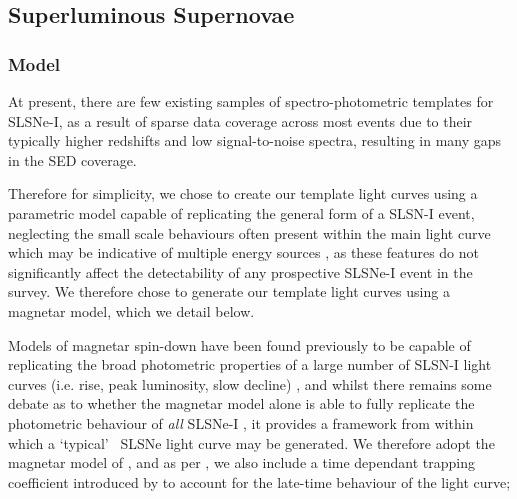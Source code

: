 \documentclass[a4paper,fleqn,usenatbib]{mnras}
\newcommand{\angus}[1]{\color{JungleGreen}#1\color{black}}
\newcommand{\comment}[1]{\textbf{[#1]}}
\begin{document}

\subsection{Superluminous Supernovae}

\subsubsection{Model}
\label{sec:simSLSN}
At present, there are few existing samples of spectro-photometric templates for SLSNe-I, as a result of sparse data coverage across most events due to their typically higher redshifts and low signal-to-noise spectra, resulting in many gaps in the SED coverage.

Therefore for simplicity, we chose to create our template light curves using a parametric model capable of replicating the general form of a SLSN-I event, neglecting the small scale behaviours often present within the main light curve which may be indicative of multiple energy sources \citep[e.g.][]{Inserra2017b}, as these features do not significantly affect the detectability of any prospective SLSNe-I event in the survey. We therefore chose to generate our template light curves using a magnetar model, which we detail below.

Models of magnetar spin-down have been found previously to be capable of replicating the broad photometric properties of a large number of SLSN-I light curves (i.e. rise, peak luminosity, slow decline) \citep{Inserra2013,Nicholl2013,Nicholl2017B,Dessart2019}, and whilst there remains some debate as to whether the magnetar model alone is able to fully replicate the photometric behaviour of {\textit{all}} SLSNe-I \citep[e.g.][]{Inserra2017b,Angus2018}, it provides a framework from within which a \lq typical\rq~ SLSNe light curve may be generated. We therefore adopt the magnetar model of \cite{Inserra2013}, and as per \cite{Prajs2016}, we also include a time dependant trapping coefficient introduced by \cite{Wange2015} to account for the late-time behaviour of the light curve;
\end{document}
